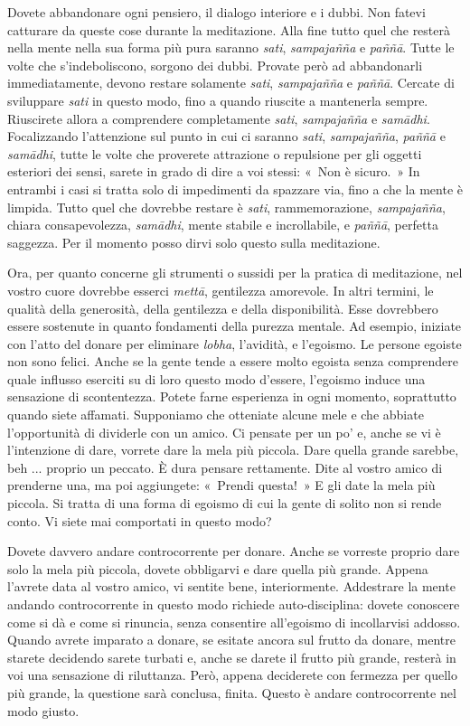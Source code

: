 Dovete abbandonare ogni pensiero, il dialogo interiore e i dubbi. Non
fatevi catturare da queste cose durante la meditazione. Alla fine tutto
quel che resterà nella mente nella sua forma più pura saranno
\emph{sati}, \emph{sampajañña} e \emph{paññā}. Tutte le volte che
s'indeboliscono, sorgono dei dubbi. Provate però ad abbandonarli
immediatamente, devono restare solamente \emph{sati}, \emph{sampajañña}
e \emph{paññā}. Cercate di sviluppare \emph{sati} in questo modo, fino a
quando riuscite a mantenerla sempre. Riuscirete allora a comprendere
completamente \emph{sati}, \emph{sampajañña} e \emph{samādhi}.
Focalizzando l'attenzione sul punto in cui ci saranno \emph{sati},
\emph{sampajañña}, \emph{paññā} e \emph{samādhi}, tutte le volte che
proverete attrazione o repulsione per gli oggetti esteriori dei sensi,
sarete in grado di dire a voi stessi: «~Non è sicuro.~» In entrambi i
casi si tratta solo di impedimenti da spazzare via, fino a che la mente
è limpida. Tutto quel che dovrebbe restare è \emph{sati},
rammemorazione, \emph{sampajañña}, chiara consapevolezza,
\emph{samādhi}, mente stabile e incrollabile, e \emph{paññā}, perfetta
saggezza. Per il momento posso dirvi solo questo sulla meditazione.

Ora, per quanto concerne gli strumenti o sussidi per la pratica di
meditazione, nel vostro cuore dovrebbe esserci \emph{mettā}, gentilezza
amorevole. In altri termini, le qualità della generosità, della
gentilezza e della disponibilità. Esse dovrebbero essere sostenute in
quanto fondamenti della purezza mentale. Ad esempio, iniziate con l'atto
del donare per eliminare \emph{lobha}, l'avidità, e l'egoismo. Le
persone egoiste non sono felici. Anche se la gente tende a essere molto
egoista senza comprendere quale influsso eserciti su di loro questo modo
d'essere, l'egoismo induce una sensazione di scontentezza. Potete farne
esperienza in ogni momento, soprattutto quando siete affamati.
Supponiamo che otteniate alcune mele e che abbiate l'opportunità di
dividerle con un amico. Ci pensate per un po' e, anche se vi è
l'intenzione di dare, vorrete dare la mela più piccola. Dare quella
grande sarebbe, beh ... proprio un peccato. È dura pensare rettamente.
Dite al vostro amico di prenderne una, ma poi aggiungete: «~Prendi
questa!~» E gli date la mela più piccola. Si tratta di una forma di
egoismo di cui la gente di solito non si rende conto. Vi siete mai
comportati in questo modo?

Dovete davvero andare controcorrente per donare. Anche se vorreste
proprio dare solo la mela più piccola, dovete obbligarvi e dare quella
più grande. Appena l'avrete data al vostro amico, vi sentite bene,
interiormente. Addestrare la mente andando controcorrente in questo modo
richiede auto-disciplina: dovete conoscere come si dà e come si
rinuncia, senza consentire all'egoismo di incollarvisi addosso. Quando
avrete imparato a donare, se esitate ancora sul frutto da donare, mentre
starete decidendo sarete turbati e, anche se darete il frutto più
grande, resterà in voi una sensazione di riluttanza. Però, appena
deciderete con fermezza per quello più grande, la questione sarà
conclusa, finita. Questo è andare controcorrente nel modo giusto.

